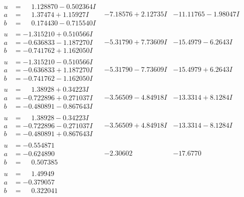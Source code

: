 \documentclass[1p]{elsarticle_modified}
\theoremstyle{definition}
\begin{document}
$$\begin{array}{c|c|c}
\begin{aligned}
u &= \phantom{-}1.128870 - 0.502364 I \\
a &= \phantom{-}1.37474 + 1.15927 I \\
b &= \phantom{-}0.174430 - 0.715540 I\end{aligned}
 & -7.18576 + 2.12735 I & -11.11765 - 1.98047 I \\ \hline\begin{aligned}
u &= -1.315210 + 0.510566 I \\
a &= -0.636833 - 1.187270 I \\
b &= -0.741762 + 1.162050 I\end{aligned}
 & -5.31790 + 7.73609 I & -15.4979 - 6.2643 I \\ \hline\begin{aligned}
u &= -1.315210 - 0.510566 I \\
a &= -0.636833 + 1.187270 I \\
b &= -0.741762 - 1.162050 I\end{aligned}
 & -5.31790 - 7.73609 I & -15.4979 + 6.2643 I \\ \hline\begin{aligned}
u &= \phantom{-}1.38928 + 0.34223 I \\
a &= -0.722896 + 0.271037 I \\
b &= -0.480891 - 0.867643 I\end{aligned}
 & -3.56509 - 4.84918 I & -13.3314 + 8.1284 I \\ \hline\begin{aligned}
u &= \phantom{-}1.38928 - 0.34223 I \\
a &= -0.722896 - 0.271037 I \\
b &= -0.480891 + 0.867643 I\end{aligned}
 & -3.56509 + 4.84918 I & -13.3314 - 8.1284 I \\ \hline\begin{aligned}
u &= -0.554871\phantom{ +0.000000I} \\
a &= -0.624890\phantom{ +0.000000I} \\
b &= \phantom{-}0.507385\phantom{ +0.000000I}\end{aligned}
 & -2.30602\phantom{ +0.000000I} & -17.6770\phantom{ +0.000000I} \\ \hline\begin{aligned}
u &= \phantom{-}1.49949\phantom{ +0.000000I} \\
a &= -0.379057\phantom{ +0.000000I} \\
b &= \phantom{-}0.322041\phantom{ +0.000000I}\end{aligned}

\end{array}$$
\end{document}
